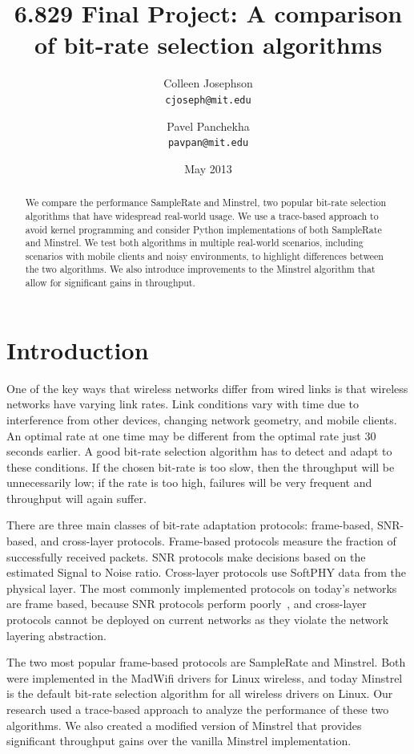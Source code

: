 \documentclass[twocolumn,10pt]{article}
\title{6.829 Final Project: A comparison of bit-rate selection algorithms}
\author{Colleen Josephson \\ \texttt{cjoseph@mit.edu}
  \and Pavel Panchekha \\ \texttt{pavpan@mit.edu}}
\date{May 2013}
\begin{document}
\maketitle

\begin{abstract}
We compare the performance SampleRate and Minstrel, two popular
bit-rate selection algorithms that have widespread real-world usage.
We use a trace-based approach to avoid kernel programming and consider
Python implementations of both SampleRate and Minstrel.  We test both
algorithms in multiple real-world scenarios, including scenarios with
mobile clients and noisy environments, to highlight differences
between the two algorithms.  We also introduce improvements to the
Minstrel algorithm that allow for significant gains in throughput.
\end{abstract}

\section{Introduction}

One of the key ways that wireless networks differ from wired links is
that wireless networks have varying link rates.  Link conditions vary
with time due to interference from other devices, changing network
geometry, and mobile clients.  An optimal rate at one time may be
different from the optimal rate just 30 seconds earlier.  A good
bit-rate selection algorithm has to detect and adapt to these
conditions.  If the chosen bit-rate is too slow, then the throughput
will be unnecessarily low; if the rate is too high, failures will
be very frequent and throughput will again suffer.

There are three main classes of bit-rate adaptation protocols:
frame-based, SNR-based, and cross-layer protocols.  Frame-based
protocols measure the fraction of successfully received packets.  SNR
protocols make decisions based on the estimated Signal to Noise
ratio.  Cross-layer protocols use SoftPHY data from the physical
layer.  The most commonly implemented protocols on today's networks are
frame based, because SNR protocols perform poorly~\cite{samplerate},
and cross-layer protocols cannot be deployed on current networks as
they violate the network layering abstraction.

The two most popular frame-based protocols are SampleRate and
Minstrel.  Both were implemented in the MadWifi drivers for Linux
wireless, and today Minstrel is the default bit-rate selection
algorithm for all wireless drivers on Linux.  Our research used a
trace-based approach to analyze the performance of these two
algorithms.  We also created a modified version of Minstrel that
provides significant throughput gains over the vanilla Minstrel
implementation.
\end{document}

